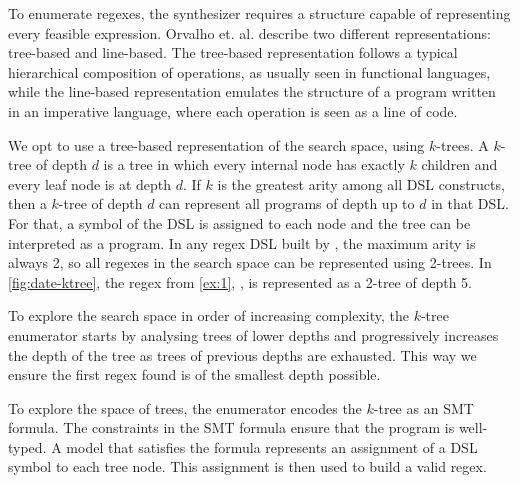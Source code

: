 To enumerate regexes, the synthesizer requires a structure capable of representing every feasible expression. %
Orvalho et. al. \cite{Orvalho19} describe two different representations: tree-based and line-based. The tree-based representation follows a typical hierarchical composition of operations, as usually seen in functional languages, while the line-based representation emulates the structure of a program written in an imperative language, where each operation is seen as a line of code.

We opt to use a tree-based representation of the search space, using \(k\)-trees. A \(k\)-tree of depth \(d\) is a tree in which every internal node has exactly \(k\) children and every leaf node is at depth \(d\).
If \(k\) is the greatest arity among all DSL constructs, then a \(k\)-tree of depth \(d\) can represent all programs of depth up to \(d\) in that \ac{DSL}. For that, a symbol of the DSL is assigned to each node and the tree can be interpreted as a program. In any regex DSL built by \Forest{}, the maximum arity is always 2, so all regexes in the search space can be represented using 2-trees. In \autoref{fig:date-ktree}, the regex from \autoref{ex:1}, , is represented as a 2-tree of depth 5.

To explore the search space in order of increasing complexity, the \(k\)-tree enumerator starts by analysing trees of lower depths and progressively increases the depth of the tree as trees of previous depths are exhausted.
This way we ensure the first regex found is of the smallest depth possible.





To explore the space of trees, the enumerator encodes the \(k\)-tree as an \ac{SMT} formula. 
%
The constraints in the \ac{SMT} formula ensure that the program is well-typed. 
%
A model that satisfies the formula represents an assignment of a DSL symbol to each tree node. This assignment is then used to build a valid regex.




